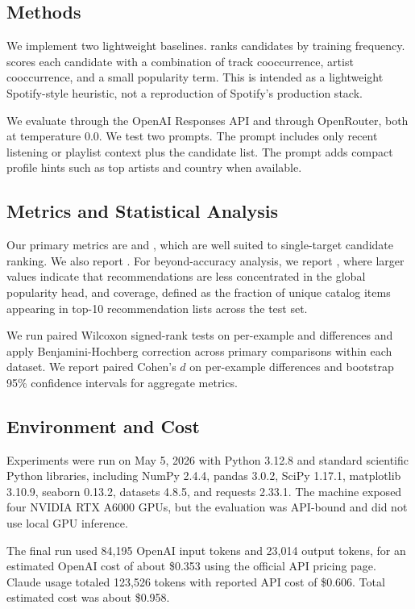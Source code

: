 \subsection{Methods}

 We implement two lightweight baselines. \popbaseline ranks candidates by training frequency. \coocbaseline scores each candidate with a combination of track cooccurrence, artist cooccurrence, and a small popularity term. This is intended as a lightweight Spotify-style heuristic, not a reproduction of Spotify's production stack.

 We evaluate \gptfourone through the OpenAI Responses API and \claudesonnet through OpenRouter, both at temperature 0.0. We test two prompts. The \minimalprompt prompt includes only recent listening or playlist context plus the candidate list. The \profileprompt prompt adds compact profile hints such as top artists and country when available.

\subsection{Metrics and Statistical Analysis}

 Our primary metrics are \mrr and \ndcg, which are well suited to single-target candidate ranking. We also report \hitten. For beyond-accuracy analysis, we report \meanpoppct, where larger values indicate that recommendations are less concentrated in the global popularity head, and coverage, defined as the fraction of unique catalog items appearing in top-10 recommendation lists across the test set.

 We run paired Wilcoxon signed-rank tests on per-example \mrr and \ndcg differences and apply Benjamini-Hochberg correction across primary comparisons within each dataset. We report paired Cohen's $d$ on per-example differences and bootstrap 95\% confidence intervals for aggregate metrics.

\subsection{Environment and Cost}

 Experiments were run on May 5, 2026 with Python 3.12.8 and standard scientific Python libraries, including NumPy 2.4.4, pandas 3.0.2, SciPy 1.17.1, matplotlib 3.10.9, seaborn 0.13.2, datasets 4.8.5, and requests 2.33.1. The machine exposed four NVIDIA RTX A6000 GPUs, but the evaluation was API-bound and did not use local GPU inference.

 The final run used 84,195 OpenAI input tokens and 23,014 output tokens, for an estimated OpenAI cost of about \$0.353 using the official \gptfourone API pricing page. Claude usage totaled 123,526 tokens with reported API cost of \$0.606. Total estimated cost was about \$0.958.
